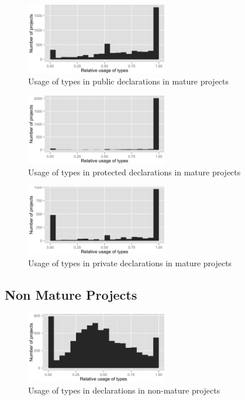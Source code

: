 \begin{figure}[h]
\centering 
\includegraphics[width=0.55\textwidth]{../aosd_2014/analysis/result/script/class/histograms/13_Public.png} 
\caption{Usage of types in public declarations in mature projects}
\end{figure}

\begin{figure}[h]
\centering 
\includegraphics[width=0.55\textwidth]{../aosd_2014/analysis/result/script/class/histograms/12_Protected.png} 
\caption{Usage of types in protected declarations in mature projects}
\end{figure}

\begin{figure}[h]
\centering 
\includegraphics[width=0.55\textwidth]{../aosd_2014/analysis/result/script/class/histograms/11_Private.png} 
\caption{Usage of types in private declarations in mature projects}
\end{figure}


\FloatBarrier
\subsection*{Non Mature Projects}

\begin{figure}[h]
\centering 
\includegraphics[width=0.55\textwidth]{../aosd_2014/analysis/result/script/class/histograms/5_all_types.png} 
\caption{Usage of types in declarations in non-mature projects}
\end{figure}

